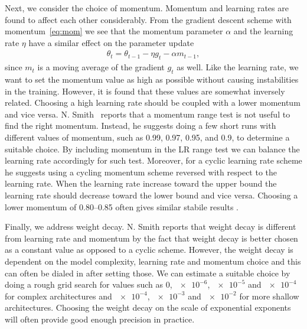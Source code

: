 Next, we consider the choice of momentum. Momentum and learning rates are found to affect each other considerably. From the gradient descent scheme with momentum~\cref{eq:mom} we see that the momentum parameter $\alpha$ and the learning rate $\eta$ have a similar effect on the parameter update
\begin{align*}
  \theta_t = \theta_{t-1} - \eta g_t - \alpha m_{t-1},
\end{align*}
since $m_t$ is a moving average of the gradient $g_t$ as well. Like the
learning rate, we want to set the momentum value as high as possible without
causing instabilities in the training. However, it is found that these values
are somewhat inversely related. Choosing a high learning rate should be coupled
with a lower momentum and vice versa. N. Smith~\cite{smith2018disciplined}
reports that a momentum range test is not useful to find the right momentum.
Instead, he suggests doing a few short runs with different values of momentum,
such as 0.99, 0.97, 0.95, and 0.9, to determine a suitable choice. By including
momentum in the LR range test we can balance the learning rate accordingly for such test. Moreover, for a cyclic learning rate scheme he suggests using a cycling momentum scheme reversed with respect to the learning rate. When the
learning rate increase toward the upper bound the learning rate should
decrease toward the lower bound and vice versa. Choosing a lower momentum of
0.80--0.85 often gives similar stabile results \cite{smith2018disciplined}.

Finally, we address weight decay. N. Smith \cite{smith2018disciplined} reports that weight decay is different from learning rate and momentum by the fact that weight decay is better chosen as a constant value as opposed to a cyclic scheme. However, the weight decay is dependent on the model complexity, learning rate and momentum choice and this can often be dialed in after setting those. We can estimate a suitable choice by doing a rough grid search for values such as 0, $\num{e-6}$, $\num{e-5}$ and $\num{e-4}$ for complex architectures and $\num{e-4}$, $\num{e-3}$ and $\num{e-2}$ for more shallow architectures. Choosing the weight decay on the scale of exponential exponents will often provide good enough precision in practice. 



